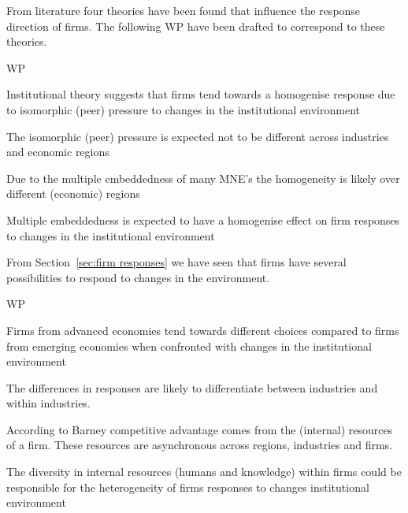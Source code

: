 From literature four theories have been found that influence the response direction of firms.
The following WP have been drafted to correspond to these theories.
\medskip

\begin{subtheorem}{WP}
\begin{WP}[Isomorphism]
Institutional theory suggests that firms tend towards a homogenise response due to isomorphic (peer) pressure to changes in the institutional environment
\end{WP}
\begin{WP}
The isomorphic (peer) pressure is expected not to be different across industries and economic regions
\end{WP}
\end{subtheorem}

Due to the multiple embeddedness of many MNE's the homogeneity is likely over different (economic) regions 

\begin{WP}
Multiple embeddedness is expected to have a homogenise effect on firm responses to changes in the institutional environment
\end{WP}

From Section~\ref{sec:firm responses} we have seen that firms have several possibilities to respond to changes in the environment.

\bigskip
\begin{subtheorem}{WP}  
\begin{WP}
  Firms from advanced economies tend towards different choices compared to firms from emerging economies when confronted with  changes in the institutional environment
  \end{WP}
  \begin{WP}
    The differences in responses are likely to differentiate between industries and within industries. 
  \end{WP}
\end{subtheorem}  
\bigskip


According to Barney competitive advantage comes from the (internal) resources of a firm.
These resources are asynchronous across regions, industries and firms.
\begin{WP}
  The diversity in internal resources (humans and knowledge) within firms could be responsible for the heterogeneity of firms responses to changes institutional environment
\end{WP}

